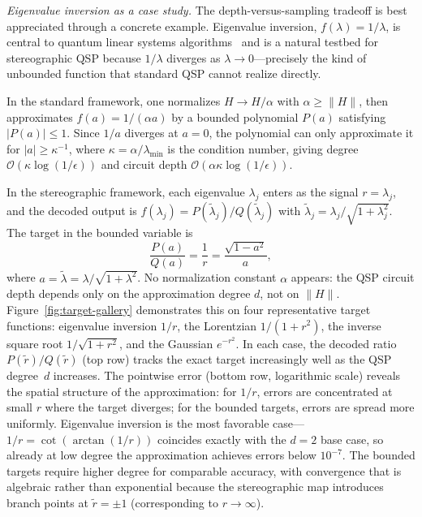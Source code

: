 \textit{Eigenvalue inversion as a case study.}
\label{subsec:inversion-example}
The depth-versus-sampling tradeoff is best appreciated through
a concrete example.  Eigenvalue inversion,
$f(\lambda) = 1/\lambda$, is central to quantum linear systems
algorithms~\cite{HHL2009,ChildsWiebe2012} and is a natural
testbed for stereographic QSP because $1/\lambda$ diverges as
$\lambda \to 0$---precisely the kind of unbounded function that
standard QSP cannot realize directly.

In the standard framework, one normalizes $H \to H/\alpha$ with
$\alpha \geq \|H\|$, then approximates $f(a) = 1/(\alpha a)$
by a bounded polynomial $P(a)$ satisfying $|P(a)| \leq 1$.
Since $1/a$ diverges at $a = 0$, the polynomial can only
approximate it for $|a| \geq \kappa^{-1}$, where
$\kappa = \alpha/\lambda_{\min}$ is the condition number, giving
degree $\mathcal{O}(\kappa \log(1/\epsilon))$ and circuit depth
$\mathcal{O}(\alpha\kappa\log(1/\epsilon))$.

In the stereographic framework, each eigenvalue $\lambda_j$
enters as the signal $r = \lambda_j$, and the decoded output is
$f(\lambda_j) = P(\tilde\lambda_j)/Q(\tilde\lambda_j)$ with
$\tilde\lambda_j = \lambda_j/\sqrt{1+\lambda_j^2}$.  The target
in the bounded variable is
\begin{equation}
	\frac{P(a)}{Q(a)} = \frac{1}{r} = \frac{\sqrt{1-a^2}}{a},
	\label{eq:inversion-target}
\end{equation}
where $a = \tilde\lambda = \lambda/\sqrt{1+\lambda^2}$.  No
normalization constant $\alpha$ appears: the QSP circuit depth
depends only on the approximation degree $d$, not on $\|H\|$.
Figure~\ref{fig:target-gallery} demonstrates this on four
representative target functions: eigenvalue inversion $1/r$,
the Lorentzian $1/(1+r^2)$, the inverse square root
$1/\sqrt{1+r^2}$, and the Gaussian $e^{-r^2}$.  In each case,
the decoded ratio $P(\tilde{r})/Q(\tilde{r})$ (top row) tracks
the exact target increasingly well as the QSP degree~$d$
increases.  The pointwise error (bottom row,
logarithmic scale) reveals the spatial structure of the
approximation: for $1/r$, errors are concentrated at small $r$
where the target diverges; for the bounded targets, errors are
spread more uniformly.  Eigenvalue inversion is the most
favorable case---$1/r = \cot(\arctan(1/r))$ coincides exactly
with the $d = 2$ base case, so already at low degree the
approximation achieves errors below $10^{-7}$.  The bounded
targets require higher degree for comparable accuracy, with
convergence that is algebraic rather than exponential because the
stereographic map introduces branch points at $\tilde{r} = \pm 1$
(corresponding to $r \to \infty$).

